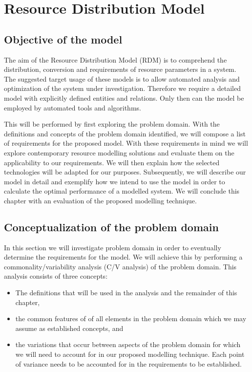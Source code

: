  

\newcommand{\rdmid}{2}
\chapter{Resource Distribution Model}
\section{Objective of the model}
The aim of the Resource Distribution Model (RDM) is to comprehend the distribution, conversion and requirements of resource parameters in a system. The suggested target usage of these models is to allow automated analysis and optimization of the system under investigation. Therefore we require a detailed model with explicitly defined entities and relations. Only then can the model be employed by automated tools and algorithms.

This will be performed by first exploring the problem domain. With the definitions and concepts of the problem domain identified, we will compose a list of requirements for the proposed model. With these requirements in mind we will explore contemporary resource modelling solutions and evaluate them on the applicability to our requirements. We will then explain how the selected technologies will be adapted for our purposes. Subsequently, we will describe our model in detail and exemplify how we intend to use the model in order to calculate the optimal performance of a modelled system. We will conclude this chapter with an evaluation of the proposed modelling technique.

\section{Conceptualization of the problem domain}
\label{sec:cv_analysis}
In this section we will investigate problem domain in order to eventually determine the requirements for the model. We will achieve this by performing a commonality/variability analysis (C/V analysis) \cite{var_invar} of the problem domain. This analysis consists of three concepts:
\begin{itemize}
\item The definitions that will be used in the analysis and the remainder of this chapter, 
\item the common features of of all elements in the problem domain which we may assume as established concepts, and 
\item the variations that occur between aspects of the problem domain for which we will need to account for in our proposed modelling technique. Each point of variance needs to be accounted for in the requirements to be established.
\end{itemize}

